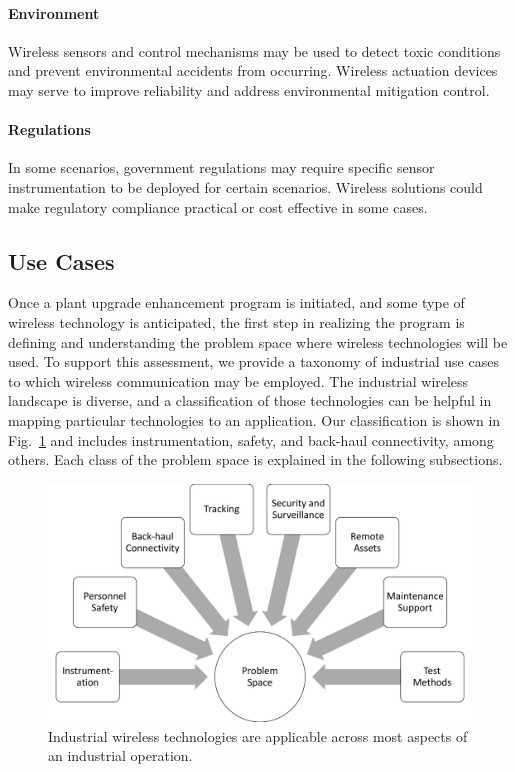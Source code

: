 \paragraph{Environment} Wireless sensors and control mechanisms may be used to detect toxic conditions and prevent environmental accidents from occurring.  Wireless actuation devices may serve to improve reliability and address environmental mitigation control. 
\paragraph{Regulations} In some scenarios, government regulations may require specific sensor instrumentation to be deployed for certain scenarios.  Wireless solutions could make regulatory compliance practical or cost effective in some cases.
      
    \subsection{Use Cases}
    
    Once a plant upgrade enhancement program is initiated, and some type of wireless technology is anticipated, the first step in realizing the program is defining and understanding the problem space where wireless technologies will be used. To support this assessment, we provide a taxonomy of industrial use cases to which wireless communication may be employed.  The industrial wireless landscape is diverse, and a classification of those technologies can be helpful in mapping particular technologies to an application.  Our classification is shown in Fig.~\ref{fig:problemspace} and includes instrumentation, safety, and back-haul connectivity, among others. Each class of the problem space is explained in the following subsections.  

\begin{figure}[t]
\centering
\includegraphics[width=\columnwidth]{./chapter-reswk/figs/probsp}
\caption{Industrial wireless technologies are applicable across most aspects of an industrial operation.}
\label{fig:problemspace}
\end{figure}   


